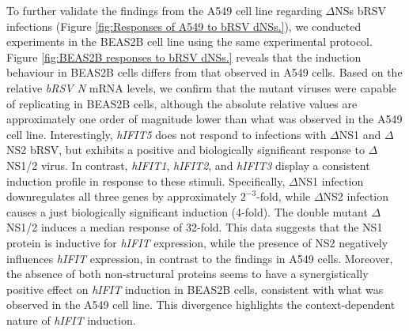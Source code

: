To further validate the findings from the A549 cell line regarding \(\Delta\)NSs bRSV infections (Figure \ref{fig:Responses of A549 to bRSV dNSs.}), we conducted experiments in the BEAS2B cell line using the same experimental protocol. Figure \ref{fig:BEAS2B responses to bRSV dNSs.} reveals that the induction behaviour in BEAS2B cells differs from that observed in A549 cells. Based on the relative \textit{bRSV N} mRNA levels, we confirm that the mutant viruses were capable of replicating in BEAS2B cells, although the absolute relative values are approximately one order of magnitude lower than what was observed in the A549 cell line. Interestingly, \textit{hIFIT5} does not respond to infections with \(\Delta\)NS1 and \(\Delta\)NS2 bRSV, but exhibits a positive and biologically significant response to \(\Delta\)NS1/2 virus. In contrast, \textit{hIFIT1}, \textit{hIFIT2}, and \textit{hIFIT3} display a consistent induction profile in response to these stimuli. Specifically, \(\Delta\)NS1 infection downregulates all three genes by approximately \(2^{-3}\)-fold, while \(\Delta\)NS2 infection causes a just biologically significant induction (4-fold). The double mutant \(\Delta\)NS1/2 induces a median response of 32-fold. This data suggests that the NS1 protein is inductive for \textit{hIFIT} expression, while the presence of NS2 negatively influences \textit{hIFIT} expression, in contrast to the findings in A549 cells. Moreover, the absence of both non-structural proteins seems to have a synergistically positive effect on \textit{hIFIT} induction in BEAS2B cells, consistent with what was observed in the A549 cell line. This divergence highlights the context-dependent nature of \textit{hIFIT} induction.


